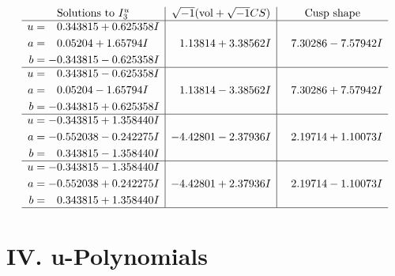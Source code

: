 \documentclass[1p]{elsarticle_modified}
\theoremstyle{definition}
\newcommand{\I}{\sqrt{-1}}
\begin{document}
$$\begin{array}{c|c|c}  
\text{Solutions to }I^u_{3}& \I (\text{vol} + \sqrt{-1}CS) & \text{Cusp shape}\\
 \hline 
\begin{aligned}
u &= \phantom{-}0.343815 + 0.625358 I \\
a &= \phantom{-}0.05204 + 1.65794 I \\
b &= -0.343815 - 0.625358 I\end{aligned}
 & \phantom{-}1.13814 + 3.38562 I & \phantom{-}7.30286 - 7.57942 I \\ \hline\begin{aligned}
u &= \phantom{-}0.343815 - 0.625358 I \\
a &= \phantom{-}0.05204 - 1.65794 I \\
b &= -0.343815 + 0.625358 I\end{aligned}
 & \phantom{-}1.13814 - 3.38562 I & \phantom{-}7.30286 + 7.57942 I \\ \hline\begin{aligned}
u &= -0.343815 + 1.358440 I \\
a &= -0.552038 - 0.242275 I \\
b &= \phantom{-}0.343815 - 1.358440 I\end{aligned}
 & -4.42801 - 2.37936 I & \phantom{-}2.19714 + 1.10073 I \\ \hline\begin{aligned}
u &= -0.343815 - 1.358440 I \\
a &= -0.552038 + 0.242275 I \\
b &= \phantom{-}0.343815 + 1.358440 I\end{aligned}
 & -4.42801 + 2.37936 I & \phantom{-}2.19714 - 1.10073 I\\
 \hline 
 \end{array}$$\newpage
\newpage\renewcommand{\arraystretch}{1}
\centering \section*{ IV. u-Polynomials}
\end{document}
